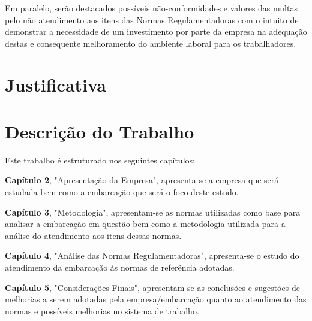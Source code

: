 Em paralelo, serão destacados possíveis não-conformidades e valores das multas pelo não atendimento aos itens das Normas Regulamentadoras com o intuito de demonstrar a necessidade de um investimento por parte da empresa na adequação destas e consequente melhoramento do ambiente laboral para os trabalhadores.

\section{Justificativa}

\section{Descrição do Trabalho}
Este trabalho é estruturado nos seguintes capítulos:

\textbf{Capítulo 2}, "Apresentação da Empresa", apresenta-se a empresa que será estudada bem como a embarcação que será o foco deste estudo.

\textbf{Capítulo 3}, "Metodologia", apresentam-se as normas utilizadas como base para analisar a embarcação em questão bem como a  metodologia utilizada para a análise do atendimento aos itens dessas normas. 

\textbf{Capítulo 4}, "Análise das Normas Regulamentadoras", apresenta-se o estudo do atendimento da embarcação às normas de referência adotadas. 

\textbf{Capítulo 5}, "Considerações Finais",  apresentam-se as conclusões e sugestões de melhorias a serem adotadas pela empresa/embarcação quanto ao atendimento das normas e possíveis melhorias no sistema de trabalho.

